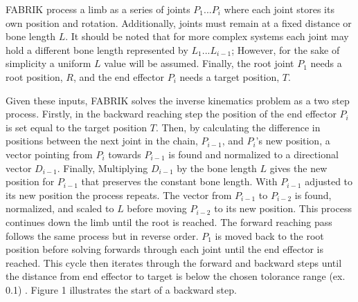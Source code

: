 \documentclass[10pt,twocolumn]{article}
\begin{document}
FABRIK process a limb as a series of joints $P_1...P_i$ where each joint stores its own position and rotation. Additionally, joints must remain at a fixed distance or bone length $L$. It should be noted that for more complex systems each joint may hold a different bone length represented by $L_1...L_{i-1}$; However, for the sake of simplicity a uniform $L$ value will be assumed. Finally, the root joint $P_1$ needs a root position, $R$, and the end effector $P_i$ needs a target position, $T$.

Given these inputs, FABRIK solves the inverse kinematics problem as a two step process. Firstly, in the backward reaching step the position of the end effector $P_i$ is set equal to the target position $T$. Then, by calculating the difference in positions between the next joint in the chain, $P_{i-1}$, and $P_i$'s new position, a vector pointing from $P_i$ towards $P_{i-1}$ is found and normalized to a directional vector $D_{i-1}$. Finally, Multiplying $D_{i-1}$ by the bone length $L$ gives the new position for $P_{i-1}$ that preserves the constant bone length. With $P_{i-1}$ adjusted to its new position the process repeats. The vector from $P_{i-1}$ to $P_{i-2}$ is found, normalized, and scaled to $L$ before moving $P_{i-2}$ to its new position. This process continues down the limb until the root is reached. The forward reaching pass follows the same process but in reverse order. $P_1$ is moved back to the root position before solving forwards through each joint until the end effector is reached. This cycle then iterates through the forward and backward steps until the distance from end effector to target is below the chosen tolorance range (ex. 0.1) \cite{baseFABRIK}. Figure 1 illustrates the start of a backward step.
\end{document}
